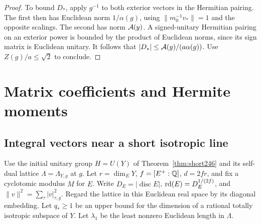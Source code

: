 \documentclass[a4paper,11pt]{article}
\theoremstyle{definition}
\theoremstyle{remark}
\numberwithin{equation}{section}
\begin{document}
\begin{proof}
To bound \(D_*\), apply \(g^{-1}\) to both exterior vectors
in the Hermitian pairing. The first then has Euclidean
norm \(1/\alpha(g)\), using \(\|m_0^{-1}v_*\|=1\) and the
opposite scalings. The second has norm \({\cal A}(y)\).
A signed-unitary Hermitian pairing on an exterior power is
bounded by the product of Euclidean norms, since its sign
matrix is Euclidean unitary. It follows that
\(|D_*|\le {\cal A}(y)/(a\alpha(g))\).
Use \(Z(g)/a\le\sqrt2\) to conclude.
\end{proof}

\section{Matrix coefficients and Hermite moments}\label{nav:g-X-2}

\subsection{Integral vectors near a short isotropic line}\label{nav:III-38}
Use the initial unitary group \(H=U(Y)\) of Theorem~\ref{thm:short246}
and its self-dual lattice \(\Lambda=\Lambda_{Y,g}\) at \(g\).
Let \(r=\dim_EY\), \(f=[E^+:\mathbb Q]\), \(d=2fr\), and fix a cyclotomic
modulus \(M\) for \(E\). Write \(D_E=|\operatorname{disc}E|\),
\({\rm rd}(E)=D_E^{1/(2f)}\), and
\(\|v\|^2=\sum_\tau|v|_{\tau,g}^2\).
Regard the lattice in this Euclidean real space by its diagonal
embedding. Let \(q_*\ge1\) be an upper bound for the dimension of
a rational totally isotropic subspace of \(Y\). Let \(\lambda_1\)
be the least nonzero Euclidean length in \(\Lambda\).
\end{document}
